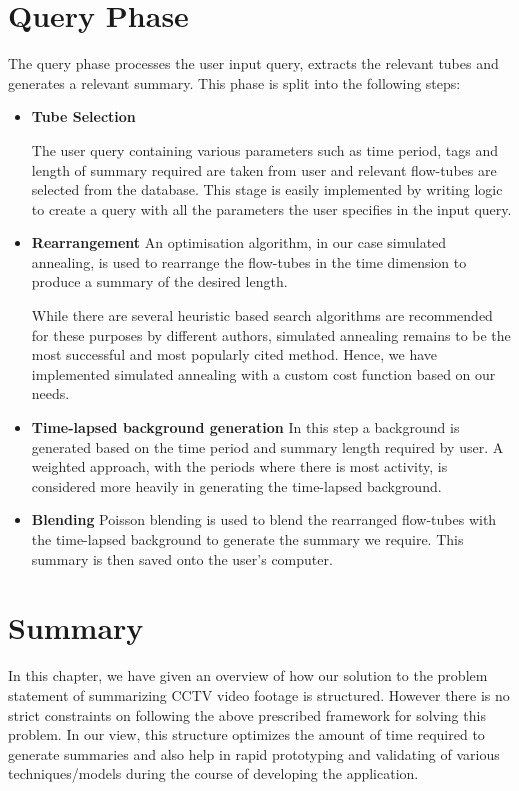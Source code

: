 \section{Query Phase}

The query phase processes the user input query, extracts the relevant tubes and generates a relevant summary. This phase is split into the following steps:

\begin{itemize}

    \item \textbf{Tube Selection}

    The user query containing various parameters such as time period, tags and length of summary required are taken from user and relevant flow-tubes are selected from the database.
    This stage is easily implemented by writing logic to create a query with all the parameters the user specifies in the input query.

    \item \textbf{Rearrangement}
    An optimisation algorithm, in our case simulated annealing, is used to rearrange the flow-tubes in the time dimension to produce a summary of the desired length.

    While there are several heuristic based search algorithms are recommended for these purposes by different authors, simulated annealing remains to be the most successful and most popularly cited method. Hence, we have implemented simulated annealing with a custom cost function based on our needs.

    \item \textbf{Time-lapsed background generation}
    In this step a background is generated based on the time period and summary length required by user.
    A weighted approach, with the periods where there is most activity, is considered more heavily in generating the time-lapsed background.

    \item \textbf{Blending}
    Poisson blending is used to blend the rearranged flow-tubes with the time-lapsed background to generate the summary we require. This summary is then saved onto the user’s computer.
\end{itemize}

\section{Summary}
In this chapter, we have given an overview of how our solution to the problem statement of summarizing CCTV video footage is structured. However there is no strict constraints on following the above prescribed framework for solving this problem. In our view, this structure optimizes the amount of time required to generate summaries and also help in rapid prototyping and validating of various techniques/models during the course of developing the application.
